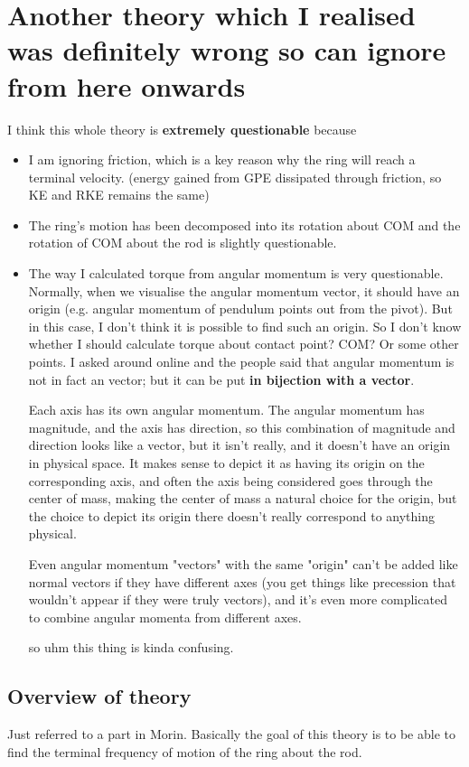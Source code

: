 \documentclass{scrartcl}
\begin{document}
\section{Another theory which I realised was definitely wrong so can ignore from here onwards}

I think this whole theory is \textbf{extremely questionable} because
\begin{itemize}
    \item I am ignoring friction, which is a key reason why the ring will reach a terminal velocity. (energy gained from GPE dissipated through friction, so KE and RKE remains the same)
    \item The ring's motion has been decomposed into its rotation about COM and the rotation of COM about the rod is slightly questionable.
    \item The way I calculated torque from angular momentum is very questionable. Normally, when we visualise the angular momentum vector, it should have an origin (e.g. angular momentum of pendulum points out from the pivot). But in this case, I don't think it is possible to find such an origin. So I don't know whether I should calculate torque about contact point? COM? Or some other points. I asked around online and the people said that angular momentum is not in fact an vector; but it can be put \textbf{in bijection with a vector}.
          \begin{mybox}
              Each axis has its own angular momentum. The angular momentum has magnitude, and the axis has direction, so this combination of magnitude and direction looks like a vector, but it isn't really, and it doesn't have an origin in physical space. It makes sense to depict it as having its origin on the corresponding axis, and often the axis being considered goes through the center of mass, making the center of mass a natural choice for the origin, but the choice to depict its origin there doesn't really correspond to anything physical.

              Even angular momentum "vectors" with the same "origin" can't be added like normal vectors if they have different axes (you get things like precession that wouldn't appear if they were truly vectors), and it's even more complicated to combine angular momenta from different axes.
          \end{mybox}
          so uhm this thing is kinda confusing.
\end{itemize}

\subsection{Overview of theory}
Just referred to a part in Morin. Basically the goal of this theory is to be able to find the terminal frequency of motion of the ring about the rod.
\end{document}
